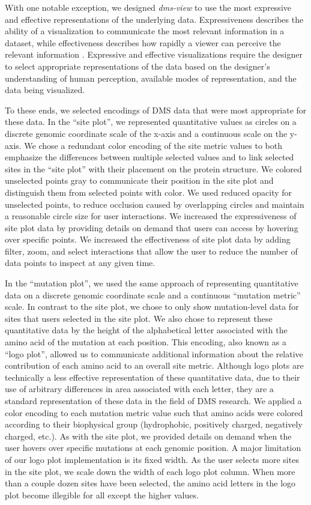 With one notable exception, we designed \emph{dms-view} to use the most expressive and effective representations of the underlying data.
Expressiveness describes the ability of a visualization to communicate the most relevant information in a dataset, while effectiveness describes how rapidly a viewer can perceive the relevant information \citep{Mackinlay1986}.
Expressive and effective visualizations require the designer to select appropriate representations of the data based on the designer's understanding of human perception, available modes of representation, and the data being visualized.

To these ends, we selected encodings of DMS data that were most appropriate for these data.
In the ``site plot'', we represented quantitative values as circles on a discrete genomic coordinate scale of the x-axis and a continuous scale on the y-axis.
We chose a redundant color encoding of the site metric values to both emphasize the differences between multiple selected values and to link selected sites in the ``site plot'' with their placement on the protein structure.
We colored unselected points gray to communicate their position in the site plot and distinguish them from selected points with color.
We used reduced opacity for unselected points, to reduce occlusion caused by overlapping circles and maintain a reasonable circle size for user interactions.
We increased the expressiveness of site plot data by providing details on demand that users can access by hovering over specific points.
We increased the effectiveness of site plot data by adding filter, zoom, and select interactions that allow the user to reduce the number of data points to inspect at any given time.

In the ``mutation plot'', we used the same approach of representing quantitative data on a discrete genomic coordinate scale and a continuous ``mutation metric'' scale.
In contrast to the site plot, we chose to only show mutation-level data for sites that users selected in the site plot.
We also chose to represent these quantitative data by the height of the alphabetical letter associated with the amino acid of the mutation at each position.
This encoding, also known as a ``logo plot'', allowed us to communicate additional information about the relative contribution of each amino acid to an overall site metric.
Although logo plots are technically a less effective representation of these quantitative data, due to their use of arbitrary differences in area associated with each letter, they are a standard representation of these data in the field of DMS research.
We applied a color encoding to each mutation metric value such that amino acids were colored according to their biophysical group (hydrophobic, positively charged, negatively charged, etc.).
As with the site plot, we provided details on demand when the user hovers over specific mutations at each genomic position.
A major limitation of our logo plot implementation is its fixed width.
As the user selects more sites in the site plot, we scale down the width of each logo plot column.
When more than a couple dozen sites have been selected, the amino acid letters in the logo plot become illegible for all except the higher values.

